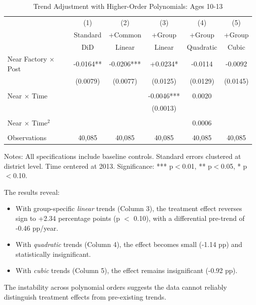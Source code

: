 \begin{table}[H]
\centering
\caption{Trend Adjustment with Higher-Order Polynomials: Ages 10-13}
\label{tab:trend_orders}
\begin{threeparttable}
\begin{tabular}{lccccc}
\toprule
& (1) & (2) & (3) & (4) & (5) \\
& Standard & +Common & +Group & +Group & +Group \\
& DiD & Linear & Linear & Quadratic & Cubic \\
\midrule
Near Factory $\times$ Post & -0.0164** & -0.0206*** & +0.0234* & -0.0114 & -0.0092 \\
& (0.0079) & (0.0077) & (0.0125) & (0.0129) & (0.0145) \\
\\
Near $\times$ Time & & & -0.0046*** & 0.0020 & \\
& & & (0.0013) & & \\
\\
Near $\times$ Time$^2$ & & & & 0.0006 & \\
\\
\midrule
Observations & 40,085 & 40,085 & 40,085 & 40,085 & 40,085 \\
\bottomrule
\end{tabular}
\begin{tablenotes}
\footnotesize
\item Notes: All specifications include baseline controls. Standard errors clustered at district level. Time centered at 2013. Significance: *** p$<$0.01, ** p$<$0.05, * p$<$0.10.
\end{tablenotes}
\end{threeparttable}
\end{table}

The results reveal:
\begin{itemize}
\item With group-specific \textit{linear} trends (Column 3), the treatment effect reverses sign to +2.34 percentage points (p $<$ 0.10), with a differential pre-trend of -0.46 pp/year.
\item With \textit{quadratic} trends (Column 4), the effect becomes small (-1.14 pp) and statistically insignificant.
\item With \textit{cubic} trends (Column 5), the effect remains insignificant (-0.92 pp).
\end{itemize}

The instability across polynomial orders suggests the data cannot reliably distinguish treatment effects from pre-existing trends.

